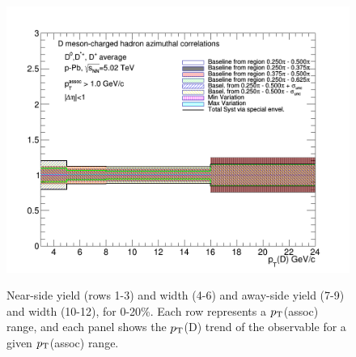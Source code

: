 \begin{figure}
{\includegraphics[width=0.32\linewidth]{figuresVsCent/Averages/020/BaselineSystematicSourcesASSigma_pthad1to99.png}} \\
 \caption{Near-side yield (rows 1-3) and width (4-6) and away-side yield (7-9) and width (10-12), for 0-20\%. Each row represents a $p_{\rm T}$(assoc) range, and each panel shows the $p_{\rm T}$(D) trend of the observable for a given $p_{\rm T}$(assoc) range.}
\label{fig:basel020}
\end{figure}

